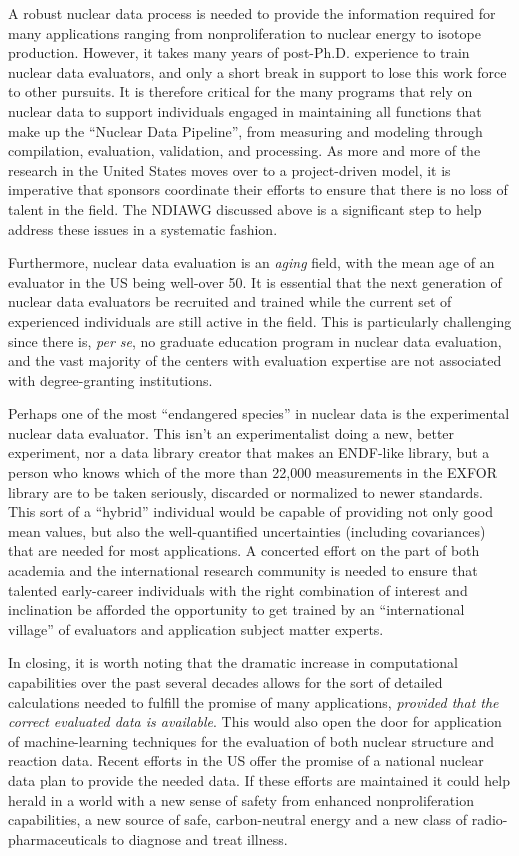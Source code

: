 \documentclass[letterpaper]{ar-1col}
\begin{document}
A robust nuclear data process is needed to provide the information required for many applications ranging from nonproliferation to nuclear energy to isotope production.
 However, it takes many years of post-Ph.D. experience to train nuclear data evaluators, and only a short break in support to lose  this work force to other pursuits.
 It is therefore critical for the many programs that rely on nuclear data to support individuals engaged in maintaining all functions that make up the \enquote{Nuclear Data Pipeline}, from measuring and modeling through compilation, evaluation, validation, and processing.
 As more and more of the research in the United States moves over to a project-driven model, it is imperative that sponsors coordinate their efforts to ensure that there is no loss of talent in the field.
 The NDIAWG discussed above is a significant step to help address these issues in a systematic fashion.

Furthermore, nuclear data evaluation is an \emph{aging} field, with the mean age of an evaluator in the US being well-over 50.
 It is essential that the next generation of nuclear data evaluators be recruited and trained while the current set of experienced individuals are still active in the field.
 This is particularly challenging since there is, \emph{per se}, no graduate education program in nuclear data evaluation, and the vast majority of the centers with evaluation expertise are not associated with degree-granting institutions.
 

Perhaps one of the most \enquote{endangered species} in nuclear data is the experimental nuclear data evaluator.
 This isn't an experimentalist doing a new, better experiment, nor a data library creator that makes an ENDF-like library, but a person who knows which of the more than 22,000 measurements in the EXFOR library are to be taken seriously, discarded or normalized to newer standards.
 This sort of a \enquote{hybrid} individual would be capable of providing not only good mean values, but also the well-quantified uncertainties (including covariances) that are needed for most applications.
 A concerted effort on the part of both academia and the international research community is needed to ensure that talented early-career individuals with the right combination of interest and inclination be afforded the opportunity to get trained by an \enquote{international village} of evaluators and application subject matter experts.
 

In closing, it is worth noting that the dramatic increase in computational capabilities over the past several decades allows for the sort of detailed calculations needed to fulfill the promise of many applications, \emph{provided that the correct evaluated data is available}.  This would also open the door for application of machine-learning techniques for the evaluation of both nuclear structure and reaction data.
  Recent efforts in the US offer the promise of a national nuclear data plan to provide the needed data.
 If these efforts are maintained it could help herald in a world with a new sense of safety from enhanced nonproliferation capabilities, a new source of safe, carbon-neutral energy and a new class of radio-pharmaceuticals to diagnose and treat illness.  
\end{document}
